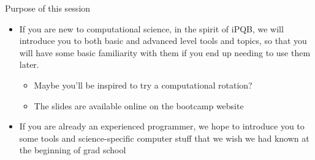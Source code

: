 \begin{frame}{Purpose of this session}
  \begin{itemize}
  \item If you are new to computational science, in the spirit of iPQB,
    we will introduce you to both basic and advanced level tools and
    topics, so that you will have some basic familiarity with them
    if you end up needing to use them later.
    \begin{itemize}
    \item Maybe you'll be inspired to try a computational rotation?
    \item The slides are available online on the bootcamp website
    \end{itemize}
  \item If you are already an experienced programmer, we hope to introduce
    you to some tools and science-specific computer stuff that we wish
    we had known at the beginning of grad school
  \end{itemize}
\end{frame}
